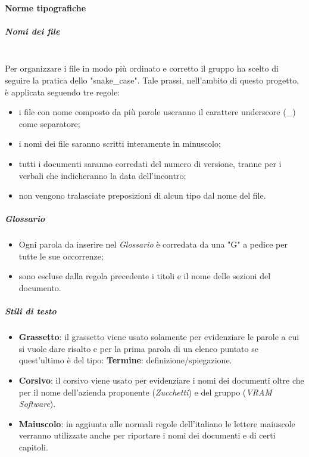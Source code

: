        \paragraph{Norme tipografiche}
                \subparagraph{Nomi dei file}\mbox{}\\ [1mm]
                    Per organizzare i file in modo più ordinato e corretto il gruppo ha scelto di seguire la pratica dello "snake\_case"\glo.
                    Tale prassi, nell'ambito di questo progetto\glo, è applicata seguendo tre regole:
                    \begin{itemize}
                        \item i file con nome composto da più parole useranno il carattere underscore (\_) come separatore;
                        \item i nomi dei file saranno scritti interamente in minuscolo;
                        \item tutti i documenti saranno corredati del numero di versione, tranne per i verbali che indicheranno la data dell'incontro;
                        \item non vengono tralasciate preposizioni di alcun tipo dal nome del file.
                    \end{itemize}
                \subparagraph{Glossario}
                    \begin{itemize}
                        \item Ogni parola da inserire nel \textit{Glossario} è corredata da una "G" a pedice per tutte le sue occorrenze;
                        \item sono escluse dalla regola precedente i titoli e il nome delle sezioni del documento.
                    \end{itemize}
                \subparagraph{Stili di testo}
                \begin{itemize}
                    \item \textbf{Grassetto}: il grassetto viene usato solamente per evidenziare le parole a cui si vuole dare risalto e per la prima parola
                                              di un elenco puntato se quest'ultimo è del tipo: \textbf{Termine}: definizione/spiegazione.
                    \item \textbf{Corsivo}: il corsivo viene usato per evidenziare i nomi dei documenti oltre che per il nome dell'azienda
                                            proponente (\textit{Zucchetti}) e del gruppo (\textit{VRAM Software}).
                    \item \textbf{Maiuscolo}: in aggiunta alle normali regole dell'italiano le lettere maiuscole verranno utilizzate anche per riportare i nomi dei
                                              documenti e di certi capitoli.
                \end{itemize}
